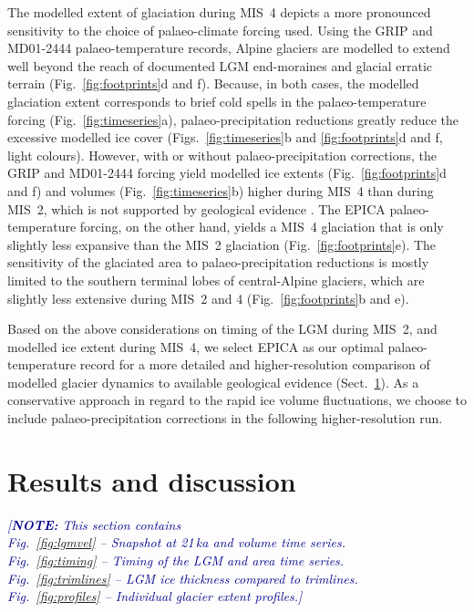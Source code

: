 \documentclass[tc, manuscript]{copernicus}
\newcommand{\note}[1]{\textcolor{darkblue}{\emph{[\textbf{NOTE:} #1]}}}
\begin{document}
    The modelled extent of glaciation during MIS~4 depicts a more pronounced
    sensitivity to the choice of palaeo-climate forcing used. Using the GRIP
    and MD01-2444 palaeo-temperature records, Alpine glaciers are modelled to
    extend well beyond the reach of documented LGM end-moraines and glacial
    erratic terrain (Fig.~\ref{fig:footprints}d and f). Because, in both cases,
    the modelled glaciation extent corresponds to brief cold spells in the
    palaeo-temperature forcing (Fig.~\ref{fig:timeseries}a),
    palaeo-precipitation reductions greatly reduce the excessive modelled ice
    cover (Figs.~\ref{fig:timeseries}b and \ref{fig:footprints}d and f, light
    colours). However, with or without palaeo-precipitation corrections,
    the GRIP and MD01-2444 forcing yield
    modelled ice extents (Fig.~\ref{fig:footprints}d and f) and volumes
    (Fig.~\ref{fig:timeseries}b) higher during MIS~4 than
    during MIS~2, which is not supported by geological evidence
    \citep{Preusser.2004, Ivy-Ochs.etal.2008}.
    The EPICA palaeo-temperature forcing, on the other hand, yields a MIS~4
    glaciation that is only slightly less expansive than the MIS~2 glaciation
    (Fig.~\ref{fig:footprints}e). The sensitivity of the glaciated area to
    palaeo-precipitation reductions is mostly limited to the southern terminal
    lobes of central-Alpine glaciers, which are slightly less extensive during
    MIS~2 and 4 (Fig.~\ref{fig:footprints}b and e).

    Based on the above considerations on timing of the LGM during MIS~2, and
    modelled ice
    extent during MIS~4, we select EPICA as our optimal palaeo-temperature
    record for a more detailed and higher-resolution comparison of modelled
    glacier dynamics to available geological evidence
    (Sect.~\ref{sec:results}). As a conservative approach in regard to the
    rapid ice volume fluctuations, we choose to include palaeo-precipitation
    corrections in the following higher-resolution run.


\section{Results and discussion}
\label{sec:results}

    \note{This section contains\\
        Fig.~\ref{fig:lgmvel} -- Snapshot at 21\,ka and volume time series.\\
        Fig.~\ref{fig:timing} -- Timing of the LGM and area time series.\\
        Fig.~\ref{fig:trimlines} -- LGM ice thickness compared to trimlines.\\
        Fig.~\ref{fig:profiles} -- Individual glacier extent profiles.}
\end{document}
